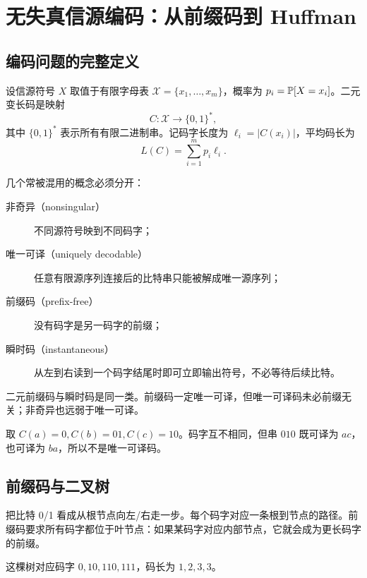 \chapter{无失真信源编码：从前缀码到 Huffman}

\section{编码问题的完整定义}

设信源符号 $X$ 取值于有限字母表 $\mathcal X=\{x_1,\dots,x_m\}$，概率为 $p_i=\mathbb{P}[X=x_i]$。二元变长码是映射
\[
C:\mathcal X\to\{0,1\}^*,
\]
其中 $\{0,1\}^*$ 表示所有有限二进制串。记码字长度为 $\ell_i=|C(x_i)|$，平均码长为
\[
L(C)=\sum_{i=1}^m p_i\ell_i.
\]

几个常被混用的概念必须分开：
\begin{description}
  \item[非奇异（nonsingular）] 不同源符号映到不同码字；
  \item[唯一可译（uniquely decodable）] 任意有限源序列连接后的比特串只能被解成唯一源序列；
  \item[前缀码（prefix-free）] 没有码字是另一码字的前缀；
  \item[瞬时码（instantaneous）] 从左到右读到一个码字结尾时即可立即输出符号，不必等待后续比特。
\end{description}
二元前缀码与瞬时码是同一类。前缀码一定唯一可译，但唯一可译码未必前缀无关；非奇异也远弱于唯一可译。

\begin{example}[非奇异但不可唯一译]
取 $C(a)=0,C(b)=01,C(c)=10$。码字互不相同，但串 $010$ 既可译为 $ac$，也可译为 $ba$，所以不是唯一可译码。
\end{example}

\section{前缀码与二叉树}

把比特 0/1 看成从根节点向左/右走一步。每个码字对应一条根到节点的路径。前缀码要求所有码字都位于叶节点：如果某码字对应内部节点，它就会成为更长码字的前缀。

\begin{center}
\end{center}
这棵树对应码字 $0,10,110,111$，码长为 $1,2,3,3$。

